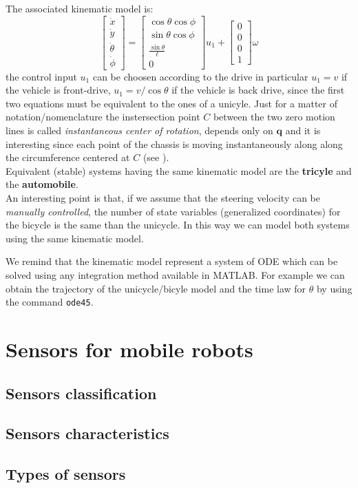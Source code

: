 \noindent
The associated kinematic model is:
\begin{equation}
    \begin{bmatrix}
        \dot{x}\\
        \dot{y}\\
        \dot{\theta}\\
        \dot{\phi}
    \end{bmatrix}=\begin{bmatrix}
        \cos\theta\cos\phi\\
        \sin\theta\cos\phi\\
        \frac{\sin\theta}{\ell}\\
        0
    \end{bmatrix}u_1 + \begin{bmatrix}
        0\\
        0\\
        0\\1
    \end{bmatrix}\omega
\end{equation}
the control input $u_1$ can be choosen according to the drive in particular $u_1=v$ if the vehicle is front-drive, $u_1=v/\cos\theta$ if the vehicle is back drive, since the first two equations must be equivalent to the ones of a unicyle. Just for a matter of notation/nomenclature the instersection point $C$ between the two zero motion lines is called \textit{instantaneous center of rotation}, depends only on $\mathbf{q}$ and it is interesting since each point of the chassis is moving instantaneously along along the circumference centered at $C$ (see ).\\
Equivalent (stable) systems having the same kinematic model are the \textbf{tricyle} and the \textbf{automobile}.\\
An interesting point is that, if we assume that the steering velocity can be \textit{manually controlled}, the number of state variables (generalized coordinates) for the bicycle is the same than the unicycle. In this way we can model both systems using the same kinematic model.
\begin{remark}
    We remind that the kinematic model represent a system of ODE which can be solved using any integration method available in MATLAB. For example we can obtain the trajectory of the unicycle/bicyle model and the time law for $\theta$ by using the command \texttt{ode45}.
\end{remark}

\section{Sensors for mobile robots}
\subsection{Sensors classification}
\subsection{Sensors characteristics}
\subsection{Types of sensors}

